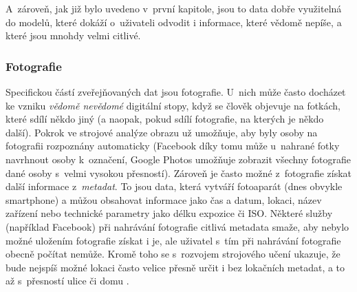 A~zároveň, jak již bylo uvedeno v~první kapitole, jsou to data dobře využitelná do modelů, které dokáží o~uživateli odvodit i informace, které vědomě nepíše, a které jsou mnohdy velmi citlivé.

\subsubsection*{Fotografie}
Specifickou částí zveřejňovaných dat jsou fotografie. U~nich může často docházet ke vzniku \textit{vědomě nevědomé} digitální stopy, když se člověk objevuje na fotkách, které sdílí někdo jiný (a naopak, pokud sdílí fotografie, na kterých je někdo další).
Pokrok ve strojové analýze obrazu už umožňuje, aby byly osoby na fotografii rozpoznány automaticky (Facebook díky tomu může u~nahrané fotky navrhnout osoby k~označení, Google Photos umožňuje zobrazit všechny fotografie dané osoby s~velmi vysokou přesností).
Zároveň je často možné z~fotografie získat další informace z~\textit{metadat}. To jsou data, která vytváří fotoaparát (dnes obvykle smartphone) a můžou obsahovat informace jako čas a datum, lokaci, název zařízení nebo technické parametry jako délku expozice či ISO. Některé služby (například Facebook) při nahrávání fotografie citlivá metadata smaže, aby nebylo možné uložením fotografie získat i je, ale uživatel s~tím při nahrávání fotografie obecně počítat nemůže.
Kromě toho se s~rozvojem strojového učení ukazuje, že bude nejspíš možné lokaci často velice přesně určit i bez lokačních metadat, a to až s~přesností ulice či domu \citep{ai-photo-location}.

